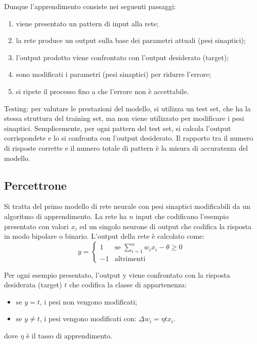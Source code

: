 Dunque l'apprendimento consiste nei seguenti passaggi:
\begin{enumerate}
	\item viene presentato un pattern di input alla rete;
	\item la rete produce un output sulla base dei parametri attuali (pesi
	sinaptici);
	\item l'output prodotto viene confrontato con l'output desiderato (target);
	\item sono modificati i parametri (pesi sinaptici) per ridurre l'errore;
	\item si ripete il processo fino a che l'errore non è accettabile.
\end{enumerate}

Testing: per valutare le prestazioni del modello, si utilizza un test set, che
ha la stessa struttura del training set, ma non viene utilizzato per modificare
i pesi sinaptici. Semplicemente, per ogni pattern del test set, si calcola
l'output corrispondete e lo si confronta con l'output desiderato. Il rapporto tra
il numero di risposte corrette e il numero totale di pattern è la misura di
accuratezza del modello.

\subsection{Percettrone}

Si tratta del primo modello di rete neurale con pesi sinaptici modificabili da
un algoritmo di apprendimento. La rete ha $n$ input che codificano l'esempio
presentato con valori $x_i$ ed un singolo neurone di output che codifica la
risposta in modo bipolare o binario. L'output della rete è calcolato come:
\begin{equation}
	y = \begin{cases}
		1 & \text{se } \sum_{i=1}^{n} w_i x_i - \theta \geq 0 \\
		-1 & \text{altrimenti}
	\end{cases}
\end{equation}

Per ogni esempio presentato, l'output y viene confrontato con la risposta
desiderata (target) $t$ che codifica la classe di appartenenza:
\begin{itemize}
\item se $y = t$, i pesi non vengono modificati;
\item se $y \neq t$, i pesi vengono modificati con: $\Delta w_i = \eta t x_i$.
\end{itemize}
dove $\eta$ è il tasso di apprendimento.

